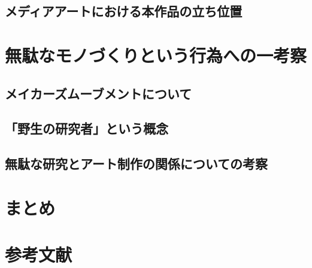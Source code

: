 \section{メディアアートにおける本作品の立ち位置}\label{ux30e1ux30c7ux30a3ux30a2ux30a2ux30fcux30c8ux306bux304aux3051ux308bux672cux4f5cux54c1ux306eux7acbux3061ux4f4dux7f6e}

\chapter{無駄なモノづくりという行為への一考察}\label{ux7121ux99c4ux306aux30e2ux30ceux3065ux304fux308aux3068ux3044ux3046ux884cux70baux3078ux306eux4e00ux8003ux5bdf}

\section{メイカーズムーブメントについて}\label{ux30e1ux30a4ux30abux30fcux30baux30e0ux30fcux30d6ux30e1ux30f3ux30c8ux306bux3064ux3044ux3066}

\section{「野生の研究者」という概念}\label{ux91ceux751fux306eux7814ux7a76ux8005ux3068ux3044ux3046ux6982ux5ff5}

\section{無駄な研究とアート制作の関係についての考察}\label{ux7121ux99c4ux306aux7814ux7a76ux3068ux30a2ux30fcux30c8ux5236ux4f5cux306eux95a2ux4fc2ux306bux3064ux3044ux3066ux306eux8003ux5bdf}

\chapter{まとめ}\label{ux307eux3068ux3081}

\chapter{参考文献}\label{ux53c2ux8003ux6587ux732e}
